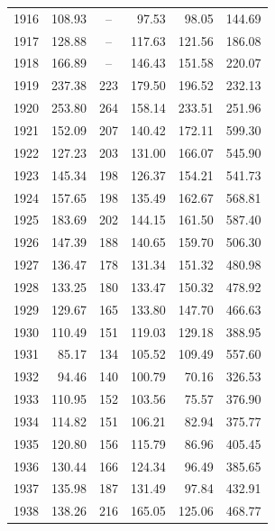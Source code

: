 \begin{enumerate}[a.)]
\begin{longtable}{@{}lrrrrr@{}}
		1916  & 108.93 &--~  & 97.53  & 98.05  & 144.69 \\
		1917  & 128.88 &--~  & 117.63  & 121.56 &  186.08\\ 
		1918  & 166.89 &--~  &146.43 &151.58 &220.07 \\
		1919  & 237.38& 223& 179.50 &196.52 &232.13\\
		1920  &  253.80 &264 &158.14 &233.51& 251.96 \\
		1921  & 152.09 &207 &140.42& 172.11& 599.30\\
		1922  &  127.23 &203 &131.00 &166.07& 545.90\\
		1923  & 145.34 & 198 & 126.37 & 154.21 & 541.73 \\
		1924  & 157.65 & 198 & 135.49 &  162.67 & 568.81 \\
		1925  & 183.69 &  202 &  144.15 & 161.50&  587.40 \\
		1926  & 147.39 & 188 & 140.65 & 159.70 & 506.30 \\
		1927  & 136.47 & 178 & 131.34 & 151.32 & 480.98 \\
		1928  & 133.25 & 180 & 133.47 & 150.32 & 478.92 \\
		1929  & 129.67 & 165 & 133.80 & 147.70&  466.63 \\
		1930  & 110.49 & 151 & 119.03 & 129.18 & 388.95 \\
		1931  & 85.17&  134 & 105.52 & 109.49 & 557.60 \\
		1932  & 94.46 & 140&  100.79 & 70.16 & 326.53 \\
		1933  & 110.95 & 152&  103.56 & 75.57 & 376.90 \\
		1934  & 114.82 & 151 & 106.21 & 82.94 & 375.77 \\
		1935  & 120.80 & 156 & 115.79 & 86.96 & 405.45 \\
		1936  & 130.44 & 166 & 124.34 & 96.49 & 385.65 \\
		1937  & 135.98 & 187 & 131.49 & 97.84 & 432.91 \\
		1938  & 138.26 & 216 & 165.05 & 125.06 & 468.77 \\
		\bottomrule
		\end{longtable}
\end{enumerate}	

